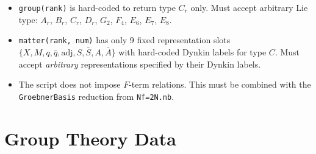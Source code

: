 \documentclass[12pt]{article}
\begin{document}
\begin{enumerate}[label=\textbf{0.\arabic*}]
\begin{itemize}
    \item \texttt{group(rank)} is hard-coded to return type $C_r$ only.
      Must accept arbitrary Lie type: $A_r$, $B_r$, $C_r$, $D_r$, $G_2$, $F_4$, $E_6$, $E_7$, $E_8$.
    \item \texttt{matter(rank, num)} has only 9 fixed representation slots
      $\{X, M, q, \bar{q}, \mathrm{adj}, S, \bar{S}, A, \bar{A}\}$ with hard-coded Dynkin labels for type $C$.
      Must accept \emph{arbitrary} representations specified by their Dynkin labels.
    \item The script does not impose $F$-term relations. This must be combined with the
      \texttt{GroebnerBasis} reduction from \texttt{Nf=2N.nb}.
  \end{itemize}

\end{enumerate}

\section{Group Theory Data}
\end{document}
